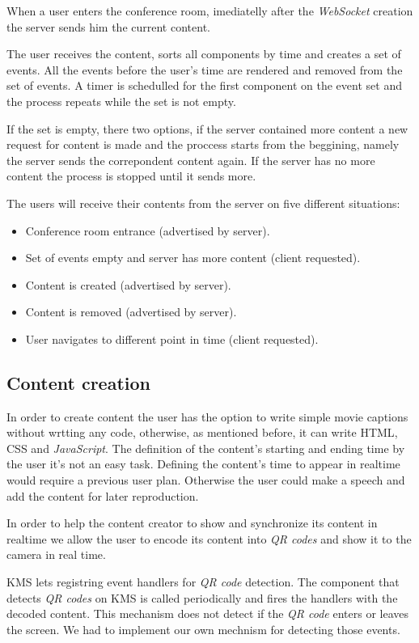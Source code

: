	When a user enters the conference room, imediatelly after the \emph{WebSocket} creation the server sends him the current content.

	The user receives the content, sorts all components by time and creates a set of events. All the events before the user's time are rendered and removed from the set of events. A timer is schedulled for the first component on the event set and the process repeats while the set is not empty.

	If the set is empty, there two options, if the server contained more content a new request for content is made and the proccess starts from the beggining, namely the server sends the correpondent content again. If the server has no more content the process is stopped until it sends more.

	The users will receive their contents from the server on five different situations:

	\begin{itemize}
		\item Conference room entrance (advertised by server).
		\item Set of events empty and server has more content (client requested).
		\item Content is created (advertised by server).
		\item Content is removed (advertised by server).
		\item User navigates to different point in time (client requested).
	\end{itemize}

	\subsection{Content creation}

	In order to create content the user has the option to write simple movie captions without wrtting any code, otherwise, as mentioned before, it can write \ac{HTML}, \ac{CSS} and \emph{JavaScript}. The definition of the content's starting and ending time by the user it's not an easy task. Defining the content's time to appear in realtime would require a previous user plan. Otherwise the user could make a speech and add the content for later reproduction.

	In order to help the content creator to show and synchronize its content in realtime we allow the user to encode its content into \emph{QR codes} and show it to the camera in real time.

	\ac{KMS} lets registring event handlers for \emph{QR code} detection. The component that detects \emph{QR codes} on \ac{KMS} is called periodically and fires the handlers with the decoded content. This mechanism does not detect if the \emph{QR code} enters or leaves the screen. We had to implement our own mechnism for detecting those events.

